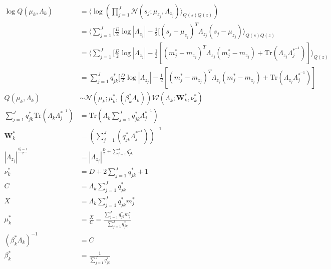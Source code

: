 \documentclass[12pt]{article}
\begin{document}
\\
\begin{equation}
\begin{aligned}
\log Q(\mu_k, \Lambda_k) &= \langle \log (\prod_{j=1}^J \mathcal{N}(s_j; \mu_{z_j}, \Lambda_{z_j}) \rangle_{Q(s)Q(z)})\\
&= \langle \sum_{j=1}^J [\frac{D}{2} \log |\Lambda_{z_j}| - \frac{1}{2}[(s_j - \mu_{z_j})^T \Lambda_{z_j} (s_j - \mu_{z_j}) \rangle_{Q(s)Q(z)}\\
&= \langle \sum_{j=1}^J [\frac{D}{2} \log |\Lambda_{z_j}| - \frac{1}{2}[(m^*_j - m_{z_j})^T \Lambda_{z_j} (m^*_j - m_{z_j}) + \text{Tr}(\Lambda_{z_j} \Lambda_j^{*^{-1}})] \rangle_{Q(z)}\\
&= \sum_{j=1}^J q_{jk}^* [\frac{D}{2} \log |\Lambda_{z_j}| - \frac{1}{2}[(m^*_j - m_{z_j})^T \Lambda_{z_j} (m^*_j - m_{z_j}) + \text{Tr}(\Lambda_{z_j} \Lambda_j^{*^{-1}})]\\
Q(\mu_k, \Lambda_k) &\sim \mathcal{N} (\mu_k; \mu^*_k, (\beta^*_k \Lambda_k)) \mathcal{W} (\Lambda_k; \mathbf{W}^*_k, \nu^*_k)\\
\sum_{j=1}^J q_{jk}^* \text{Tr} (\Lambda_k \Lambda_j^{*^{-1}}) &= \text{Tr} (\Lambda_k \sum_{j=1}^J q_{jk}^* \Lambda_j^{*^{-1}})\\
\mathbf{W}^*_k &= (\sum_{j=1}^J (q_{jk}^* \Lambda_j^{*^{-1}}))^{-1}\\
|\Lambda_{z_j}|^{\frac{\nu_k^* - 1}{2}} &= |\Lambda_{z_j}|^{\frac{D}{2} + \sum_{j=1}^J q_{jk}^*}\\
\nu_k^* &= D + 2 \sum_{j=1}^J q_{jk}^* + 1\\
C &= \Lambda_k \sum_{j=1}^J q_{jk}^*\\
X &= \Lambda_k \sum_{j=1}^J q_{jk}^* m_j^*\\
\mu^*_k &= \frac{X}{C} = \frac{\sum_{j=1}^J q_{jk}^*m_j^*}{\sum_{j=1}^J q_{jk}^*}\\
(\beta_k^* \Lambda_k)^{-1} &= C\\
\beta_k^* &= \frac{1}{\sum_{j=1}^J q_{jk}^*}\\
\end{aligned}
\end{equation}
\\
\end{document}

